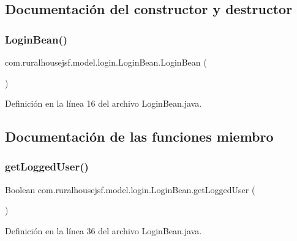 \subsection{Documentación del constructor y destructor}
\mbox{\label{classcom_1_1ruralhousejsf_1_1model_1_1login_1_1_login_bean_ae77b2f684ab6b7fc6f4fd4274ccd2c84}} 
\subsubsection{\texorpdfstring{LoginBean()}{LoginBean()}}
{\footnotesize\ttfamily com.\+ruralhousejsf.\+model.\+login.\+Login\+Bean.\+Login\+Bean (\begin{DoxyParamCaption}{ }\end{DoxyParamCaption})}



Definición en la línea 16 del archivo Login\+Bean.\+java.



\subsection{Documentación de las funciones miembro}
\mbox{\label{classcom_1_1ruralhousejsf_1_1model_1_1login_1_1_login_bean_acfc1e8aa6bd2b829d5115a5dc7e8d3d6}} 
\subsubsection{\texorpdfstring{getLoggedUser()}{getLoggedUser()}}
{\footnotesize\ttfamily Boolean com.\+ruralhousejsf.\+model.\+login.\+Login\+Bean.\+get\+Logged\+User (\begin{DoxyParamCaption}{ }\end{DoxyParamCaption})}



Definición en la línea 36 del archivo Login\+Bean.\+java.


